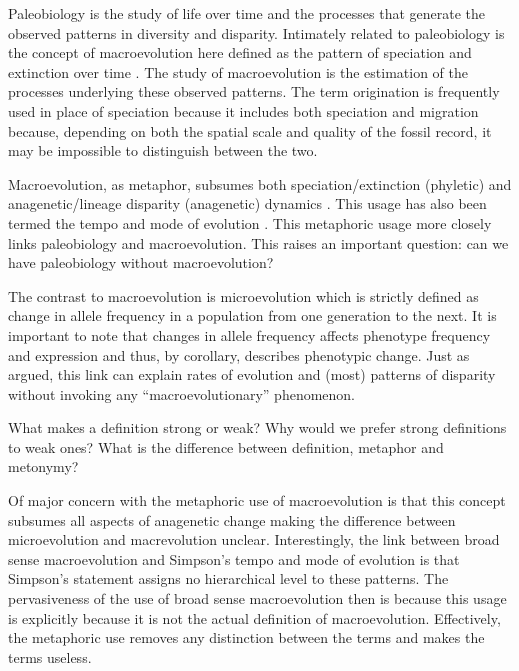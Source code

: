 \documentclass[12pt,letterpaper]{article}
\begin{document}
Paleobiology is the study of life over time and the processes that generate the observed patterns in diversity and disparity. Intimately related to paleobiology is the concept of macroevolution here defined as the pattern of speciation and extinction over time \citep{Jablonski2008a}. The study of macroevolution is the estimation of the processes underlying these observed patterns. The term origination is frequently used in place of speciation because it includes both speciation and migration because, depending on both the spatial scale and quality of the fossil record, it may be impossible to distinguish between the two.

Macroevolution, as metaphor, subsumes both speciation/extinction (phyletic) and anagenetic/lineage disparity (anagenetic) dynamics \citep{Foote2007b}. This usage has also been termed the tempo and mode of evolution \citep{Simpson1944}. This metaphoric usage more closely links paleobiology and macroevolution. This raises an important question: can we have paleobiology without macroevolution?

The contrast to macroevolution is microevolution \citep{Simpson1944,Foote2007b} which is strictly defined as change in allele frequency in a population from one generation to the next. It is important to note that changes in allele frequency affects phenotype frequency and expression and thus, by corollary, describes phenotypic change. Just as \citet{Simpson1944} argued, this link can explain rates of evolution and (most) patterns of disparity without invoking any ``macroevolutionary'' phenomenon.

What makes a definition strong or weak? Why would we prefer strong definitions to weak ones? What is the difference between definition, metaphor and metonymy?

Of major concern with the metaphoric use of macroevolution is that this concept subsumes all aspects of anagenetic change making the difference between microevolution and macrevolution unclear. Interestingly, the link between broad sense macroevolution and Simpson's tempo and mode of evolution is that Simpson's statement assigns no hierarchical level to these patterns. The pervasiveness of the use of broad sense macroevolution then is because this usage is explicitly because it is not the actual definition of macroevolution. Effectively, the metaphoric use removes any distinction between the terms and makes the terms useless.
\end{document}
